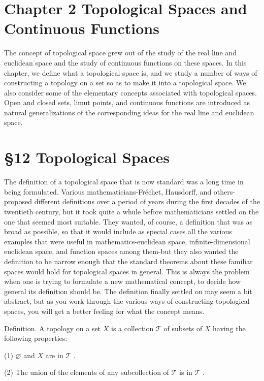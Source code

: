 \documentclass[10pt]{article}
\begin{document}
\section*{Chapter 2 Topological Spaces and Continuous Functions}

The concept of topological space grew out of the study of the real line and euclidean space and the study of continuous functions on these spaces. In this chapter, we define what a topological space is, and we study a number of ways of constructing a topology on a set so as to make it into a topological space. We also consider some of the elementary concepts associated with topological spaces. Open and closed sets, limut points, and continuous functions are introduced as natural generalizations of the corresponding ideas for the real line and euclidean space.

\section*{§12 Topological Spaces}

The definition of a topological space that is now standard was a long time in being formulated. Various mathematicians-Fréchet, Hausdorff, and others-proposed different definitions over a period of years during the first decades of the twentieth century, but it took quite a whule before mathematicians settled on the one that seemed most suitable. They wanted, of course, a definition that was as broad as possible, so that it would include as special cases all the various examples that were useful in mathematics-euclidean space, infinite-dimensional euclidean space, and function spaces among them-but they also wanted the definition to be narrow enough that the standard theorems about these familiar spaces would hold for topological spaces in general. This is always the problem when one is trying to formulate a new mathematical concept, to decide how general its definition should be. The definition finally settled on may seem a bit abstract, but as you work through the various ways of constructing topological spaces, you will get a better feeling for what the concept means.

Definition. A topology on a set \(X\) is a collection \(\mathcal{T}\) of subsets of \(X\) having the following properties:

(1) \(\varnothing\) and \(X\) are in \(\mathcal{T}\) .

(2) The union of the elements of any subcollection of \(\mathcal{T}\) is in \(\mathcal{T}\) .
\end{document}
